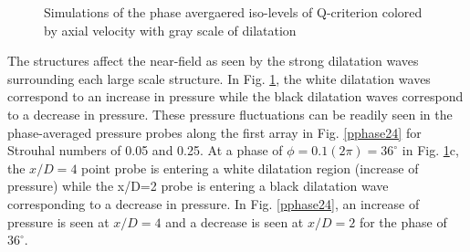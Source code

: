 \documentclass[english]{aiaa-tc}
\begin{document}
\begin{figure}
\caption{Simulations of the phase avergaered iso-levels of Q-criterion colored by axial velocity with gray scale of dilatation}\label{isophase}
\end{figure}

The structures affect the near-field as seen by the strong dilatation waves surrounding each large scale structure.
In Fig. \ref{isophase}, the white dilatation waves correspond to an increase in pressure while the black dilatation waves correspond to a decrease in pressure.
These pressure fluctuations can be readily seen in the phase-averaged pressure probes along the first array in Fig. \ref{pphase24} for Strouhal numbers of 0.05 and 0.25.
At a phase of $\phi=0.1(2\pi)=36^\circ$ in Fig. \ref{isophase}c, the $x/D=4$ point probe is entering a white dilatation region (increase of pressure) while the x/D=2 probe is entering a black dilatation wave corresponding to a decrease in pressure. In Fig. \ref{pphase24}, an increase of pressure is seen at $x/D=4$ and a decrease is seen at $x/D=2$ for the phase of $36^\circ$.
\end{document}
